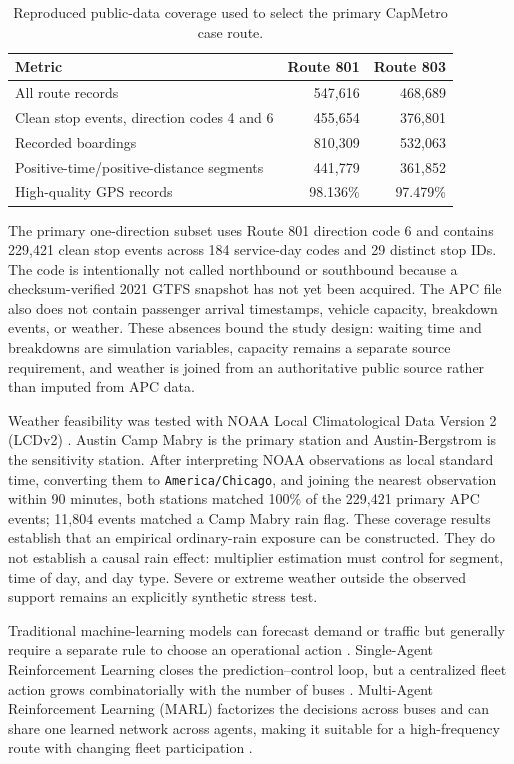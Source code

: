 \begin{table}[htbp]
\centering
\caption{Reproduced public-data coverage used to select the primary CapMetro case route.}
\label{tab:capmetro-route-selection}
\small
\renewcommand{\arraystretch}{1.2}
\begin{tabularx}{\textwidth}{Xrr}
\toprule
\textbf{Metric} & \textbf{Route 801} & \textbf{Route 803} \\
\midrule
All route records & 547{,}616 & 468{,}689 \\
Clean stop events, direction codes 4 and 6 & 455{,}654 & 376{,}801 \\
Recorded boardings & 810{,}309 & 532{,}063 \\
Positive-time/positive-distance segments & 441{,}779 & 361{,}852 \\
High-quality GPS records & 98.136\% & 97.479\% \\
\bottomrule
\end{tabularx}
\end{table}

The primary one-direction subset uses Route 801 direction code 6 and contains 229{,}421 clean stop events across 184 service-day codes and 29 distinct stop IDs. The code is intentionally not called northbound or southbound because a checksum-verified 2021 GTFS snapshot has not yet been acquired. The APC file also does not contain passenger arrival timestamps, vehicle capacity, breakdown events, or weather. These absences bound the study design: waiting time and breakdowns are simulation variables, capacity remains a separate source requirement, and weather is joined from an authoritative public source rather than imputed from APC data.

Weather feasibility was tested with NOAA Local Climatological Data Version 2 (LCDv2) \cite{NOAALCDv2}. Austin Camp Mabry is the primary station and Austin-Bergstrom is the sensitivity station. After interpreting NOAA observations as local standard time, converting them to \texttt{America/Chicago}, and joining the nearest observation within 90 minutes, both stations matched 100\% of the 229{,}421 primary APC events; 11{,}804 events matched a Camp Mabry rain flag. These coverage results establish that an empirical ordinary-rain exposure can be constructed. They do not establish a causal rain effect: multiplier estimation must control for segment, time of day, and day type. Severe or extreme weather outside the observed support remains an explicitly synthetic stress test.

Traditional machine-learning models can forecast demand or traffic but generally require a separate rule to choose an operational action \cite{Wang2017}. Single-Agent Reinforcement Learning closes the prediction--control loop, but a centralized fleet action grows combinatorially with the number of buses \cite{Chen2024Survey}. Multi-Agent Reinforcement Learning (MARL) factorizes the decisions across buses and can share one learned network across agents, making it suitable for a high-frequency route with changing fleet participation \cite{Wang2020Holding,Christianos2021PS}.

